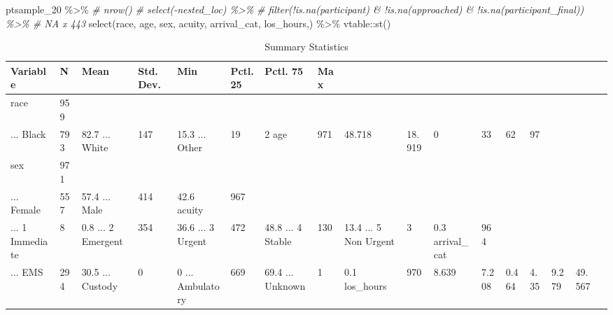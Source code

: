 \documentclass[
]{article}
\newenvironment{Shaded}{\begin{snugshade}}{\end{snugshade}}
\newcommand{\CommentTok}[1]{\textcolor[rgb]{0.56,0.35,0.01}{\textit{#1}}}
\newcommand{\FunctionTok}[1]{\textcolor[rgb]{0.00,0.00,0.00}{#1}}
\newcommand{\NormalTok}[1]{#1}
\newcommand{\SpecialCharTok}[1]{\textcolor[rgb]{0.00,0.00,0.00}{#1}}
\begin{document}
\begin{Shaded}
\begin{Highlighting}[]
\NormalTok{ptsample\_20 }\SpecialCharTok{\%\textgreater{}\%} 
  \CommentTok{\# nrow()}
  \CommentTok{\# select({-}nested\_loc) \%\textgreater{}\% }
  \CommentTok{\# filter(!is.na(participant) \& !is.na(approached) \& !is.na(participant\_final)) \%\textgreater{}\% \# NA x 443}
  \FunctionTok{select}\NormalTok{(race,}
\NormalTok{         age,}
\NormalTok{         sex,}
\NormalTok{         acuity, }
\NormalTok{         arrival\_cat,}
\NormalTok{         los\_hours,) }\SpecialCharTok{\%\textgreater{}\%} 
\NormalTok{  vtable}\SpecialCharTok{::}\FunctionTok{st}\NormalTok{()}
\end{Highlighting}
\end{Shaded}

\begin{table}

\caption{\label{tab:pt_sample}Summary Statistics}
\centering
\begin{tabular}[t]{llllllll}
\toprule
Variable & N & Mean & Std. Dev. & Min & Pctl. 25 & Pctl. 75 & Max\\
\midrule
race & 959 &  &  &  &  &  & \\
... Black & 793 & 82.7%
... White & 147 & 15.3%
... Other & 19 & 2%
age & 971 & 48.718 & 18.919 & 0 & 33 & 62 & 97\\
\addlinespace
sex & 971 &  &  &  &  &  & \\
... Female & 557 & 57.4%
... Male & 414 & 42.6%
acuity & 967 &  &  &  &  &  & \\
... 1 Immediate & 8 & 0.8%
\addlinespace
... 2 Emergent & 354 & 36.6%
... 3 Urgent & 472 & 48.8%
... 4 Stable & 130 & 13.4%
... 5 Non Urgent & 3 & 0.3%
arrival_cat & 964 &  &  &  &  &  & \\
\addlinespace
... EMS & 294 & 30.5%
... Custody & 0 & 0%
... Ambulatory & 669 & 69.4%
... Unknown & 1 & 0.1%
los_hours & 970 & 8.639 & 7.208 & 0.464 & 4.35 & 9.279 & 49.567\\
\bottomrule
\end{tabular}
\end{table}
\end{document}
